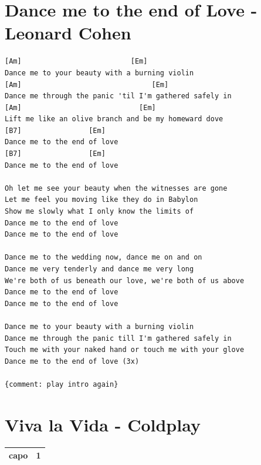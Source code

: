 \documentclass[
]{book}
\let\stdsection\section
\renewcommand\section{\clearpage\stdsection}
\begin{document}
\hypertarget{selected-songs-dance-me-to-the-end-of-love}{%
\section{Dance me to the end of Love - Leonard Cohen}\label{selected-songs-dance-me-to-the-end-of-love}}

\begin{verbatim}
[Am]                          [Em]
Dance me to your beauty with a burning violin
[Am]                               [Em]
Dance me through the panic 'til I'm gathered safely in
[Am]                            [Em]
Lift me like an olive branch and be my homeward dove
[B7]                [Em]
Dance me to the end of love
[B7]                [Em]
Dance me to the end of love

Oh let me see your beauty when the witnesses are gone 
Let me feel you moving like they do in Babylon 
Show me slowly what I only know the limits of 
Dance me to the end of love 
Dance me to the end of love 

Dance me to the wedding now, dance me on and on 
Dance me very tenderly and dance me very long 
We're both of us beneath our love, we're both of us above 
Dance me to the end of love 
Dance me to the end of love

Dance me to your beauty with a burning violin 
Dance me through the panic till I'm gathered safely in 
Touch me with your naked hand or touch me with your glove 
Dance me to the end of love (3x)

{comment: play intro again}
\end{verbatim}

\hypertarget{selected-songs-viva-la-vida}{%
\section{Viva la Vida - Coldplay}\label{selected-songs-viva-la-vida}}

\begin{longtable}[]{@{}ll@{}}
\toprule
\endhead
capo & 1\tabularnewline
\bottomrule
\end{longtable}
\end{document}
